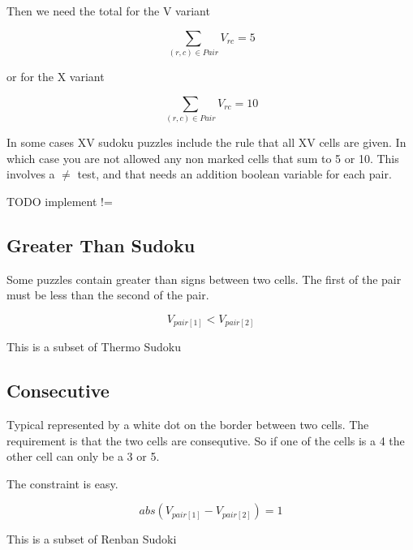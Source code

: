 \documentclass{article}
\begin{document}
Then we need the total for the V variant

\begin{equation}
\sum_{(r,c) \in Pair} V_{rc} = 5
\end{equation}

or for the X variant

\begin{equation}
\sum_{(r,c) \in Pair} V_{rc} = 10
\end{equation}

In some cases XV sudoku puzzles include the rule that all XV cells are given. In which case you are not allowed any non marked cells that sum to 5 or 10. 
This involves a \( \neq \) test, and that needs an addition boolean variable for each pair. 

TODO implement !=


\subsection{Greater Than Sudoku}

Some puzzles contain greater than signs between two cells. The first of the pair must be less than the second of the pair. 

\begin{equation}
V_{pair[1]} < V_{pair[2]}
\end{equation}

This is a subset of Thermo Sudoku


\subsection{Consecutive}

Typical represented by a white dot on the border between two cells. The requirement is that the two cells are consequtive. So if one of the cells is a 4
the other cell can only be a 3 or 5. 

The constraint is easy.

\begin{equation}
abs (V_{pair[1]} - V_{pair[2]}) = 1
\end{equation}

This is a subset of Renban Sudoki

\end{document}
